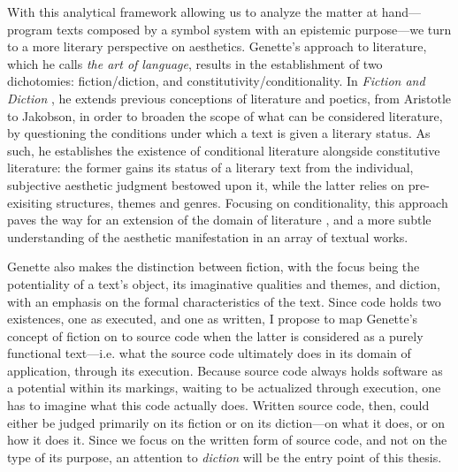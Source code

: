 With this analytical framework allowing us to analyze the matter at hand—program texts composed by a symbol system with an epistemic purpose—we turn to a more literary perspective on aesthetics. Genette's approach to literature, which he calls \emph{the art of language}, results in the establishment of two dichotomies: fiction/diction, and constitutivity/conditionality. In \emph{Fiction and Diction} \citep{genette_fiction_1993}, he extends previous conceptions of literature and poetics, from Aristotle to Jakobson, in order to broaden the scope of what can be considered literature, by questioning the conditions under which a text is given a literary status. As such, he establishes the existence of conditional literature alongside constitutive literature: the former gains its status of a literary text from the individual, subjective aesthetic judgment bestowed upon it, while the latter relies on pre-exisiting structures, themes and genres. Focusing on conditionality, this approach paves the way for an extension of the domain of literature \citep{gefen_extension_2019}, and a more subtle understanding of the aesthetic manifestation in an array of textual works.

Genette also makes the distinction between fiction, with the focus being the potentiality of a text's object, its imaginative qualities and themes, and diction, with an emphasis on the formal characteristics of the text. Since code holds two existences, one as executed, and one as written, I propose to map Genette's concept of fiction on to source code when the latter is considered as a purely functional text—i.e. what the source code ultimately does in its domain of application, through its execution. Because source code always holds software as a potential within its markings, waiting to be actualized through execution, one has to imagine what this code actually does. Written source code, then, could either be judged primarily on its fiction or on its diction—on what it does, or on how it does it. Since we focus on the written form of source code, and not on the type of its purpose, an attention to \emph{diction} will be the entry point of this thesis.

